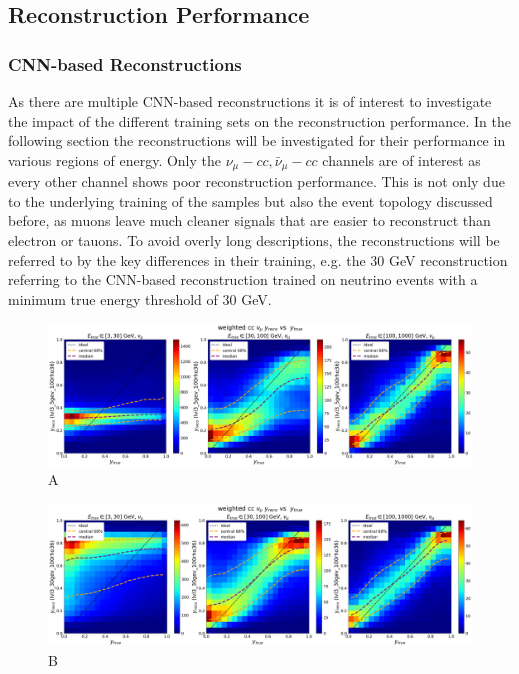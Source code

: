 \documentclass[a4paper,12pt,numbered]{article}
\begin{document}
\subsection{Reconstruction Performance}
\subsubsection{CNN-based Reconstructions}

As there are multiple CNN-based reconstructions it is of interest to investigate the impact of the different training sets on the reconstruction performance. In the following section the reconstructions will be investigated for their performance in various regions of energy. Only the $\nu_\mu-cc, \bar{\nu}_\mu-cc$ channels are of interest as every other channel shows poor reconstruction performance. This is not only due to the underlying training of the samples but also the event topology discussed before, as muons leave much cleaner signals that are easier to reconstruct than electron or tauons. To avoid overly long descriptions, the reconstructions will be referred to by the key differences in their training, e.g. the 30 GeV reconstruction referring to the CNN-based reconstruction trained on neutrino events with a minimum true energy threshold of 30 GeV.

\newpage

\begin{figure}[H]
\centering
\includegraphics[width=\textwidth]{Graphics/Inelasticity/WithCentral68/weighted/weighted_cc_ytruevsyreco_lvl3_5gev_100rho36_numu.png}
\caption{A}
\end{figure}

\begin{figure}[H]
\centering
\includegraphics[width=\textwidth]{Graphics/Inelasticity/WithCentral68/weighted/weighted_cc_ytruevsyreco_lvl3_30gev_100rho36_numu.png}
\caption{B}
\end{figure}
\end{document}
